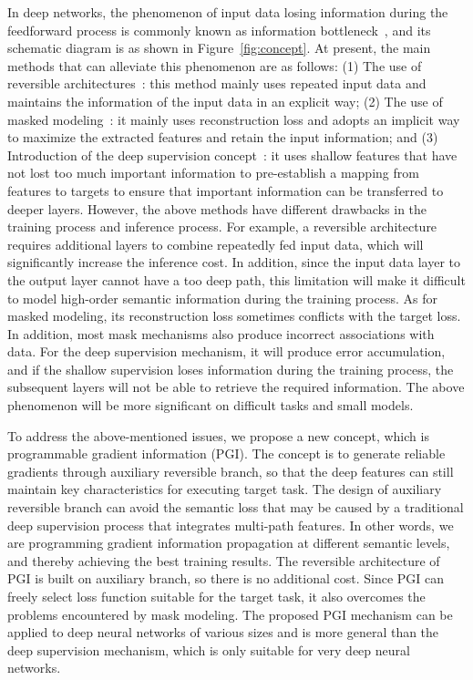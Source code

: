 \documentclass[10pt,twocolumn,letterpaper]{article}
\begin{document}
	\newpage
	
	In deep networks, the phenomenon of input data losing information during the feedforward process is commonly known as information bottleneck~\cite{tishby2015deep}, and its schematic diagram is as shown in Figure~\ref{fig:concept}.  At present, the main methods that can alleviate this phenomenon are as follows: (1) The use of reversible architectures~\cite{gomez2017reversible,cai2022reversible,han2023revcolv2}: this method mainly uses repeated input data and maintains the information of the input data in an explicit way; (2) The use of masked modeling~\cite{kenton2019bert,xie2022simmim,chen2022sdae,bao2022beit,dosovitskiy2021image,woo2023convnext}: it mainly uses reconstruction loss and adopts an implicit way to maximize the extracted features and retain the input information; and (3) Introduction of the deep supervision concept~\cite{lee2015deeply,szegedy2015going,wang2015training,shen2019object}: it uses shallow features that have not lost too much important information to pre-establish a mapping from features to targets to ensure that important information can be transferred to deeper layers.  However, the above methods have different drawbacks in the training process and inference process. For example, a reversible architecture requires additional layers to combine repeatedly fed input data, which will significantly increase the inference cost.  In addition, since the input data layer to the output layer cannot have a too deep path, this limitation will make it difficult to model high-order semantic information during the training process.  As for masked modeling, its reconstruction loss sometimes conflicts with the target loss.  In addition, most mask mechanisms also produce incorrect associations with data.  For the deep supervision mechanism, it will produce error accumulation, and if the shallow supervision loses information during the training process, the subsequent layers will not be able to retrieve the required information.  The above phenomenon will be more significant on difficult tasks and small models.
	
	\vspace{-4pt}
	
	To address the above-mentioned issues, we propose a new concept, which is programmable gradient information (PGI).  The concept is to generate reliable gradients through auxiliary reversible branch, so that the deep features can still maintain key characteristics for executing target task.  The design of auxiliary reversible branch can avoid the semantic loss that may be caused by a traditional deep supervision process that integrates multi-path features. In other words, we are programming gradient information propagation at different semantic levels, and thereby achieving the best training results.  The reversible architecture of PGI is built on auxiliary branch, so there is no additional cost.  Since PGI can freely select loss function suitable for the target task, it also overcomes the problems encountered by mask modeling.  The proposed PGI mechanism can be applied to deep neural networks of various sizes and is more general than the deep supervision mechanism, which is only suitable for very deep neural networks.
	
\end{document}
